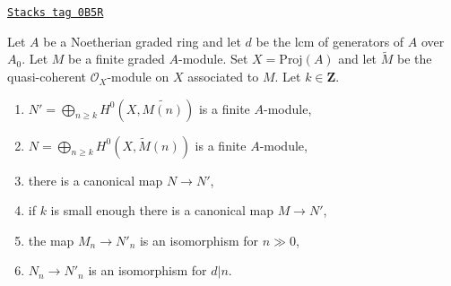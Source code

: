 \begin{lemma}
\label{coherent-lemma-recover-tail-graded-module-general}
\href{https://stacks.math.columbia.edu/tag/0B5R}{\texttt{Stacks tag 0B5R}}

Let $A$ be a Noetherian graded ring and let $d$ be the lcm of generators
of $A$ over $A_0$. Let $M$ be a finite graded $A$-module.
Set $X = \text{Proj}(A)$ and let $\widetilde{M}$ be
the quasi-coherent $\mathcal{O}_X$-module on $X$ associated to $M$.
Let $k \in \mathbf{Z}$.
\begin{enumerate}
\item $N' = \bigoplus_{n \geq k} H^0(X, \widetilde{M(n)})$
is a finite $A$-module,
\item $N = \bigoplus_{n \geq k} H^0(X, \widetilde{M}(n))$
is a finite $A$-module,
\item there is a canonical map $N \to N'$,
\item if $k$ is small enough there is a canonical map $M \to N'$,
\item the map $M_n \to N'_n$ is an isomorphism for $n \gg 0$,
\item $N_n \to N'_n$ is an isomorphism for $d | n$.
\end{enumerate}
\end{lemma}

